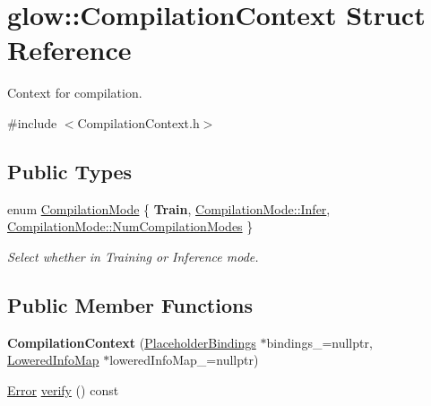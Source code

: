 \hypertarget{structglow_1_1_compilation_context}{}\section{glow\+:\+:Compilation\+Context Struct Reference}
\label{structglow_1_1_compilation_context}


Context for compilation.  




{\ttfamily \#include $<$Compilation\+Context.\+h$>$}

\subsection*{Public Types}
\begin{DoxyCompactItemize}
\item 
enum \hyperlink{structglow_1_1_compilation_context_a92efb87746c0edf7756b84fdcd87014a}{Compilation\+Mode} \{ {\bfseries Train}, 
\hyperlink{structglow_1_1_compilation_context_a92efb87746c0edf7756b84fdcd87014aa442b0d534b230e2f2c9b562974652f79}{Compilation\+Mode\+::\+Infer}, 
\hyperlink{structglow_1_1_compilation_context_a92efb87746c0edf7756b84fdcd87014aa9fd1bb83eed98173b7291341f46dce86}{Compilation\+Mode\+::\+Num\+Compilation\+Modes}
 \}\begin{DoxyCompactList}\small\item\em Select whether in Training or Inference mode. \end{DoxyCompactList}
\end{DoxyCompactItemize}
\subsection*{Public Member Functions}
\begin{DoxyCompactItemize}
\item 
\mbox{\label{structglow_1_1_compilation_context_a97e61dac204d0f830e5cc88352460ff8}} 
{\bfseries Compilation\+Context} (\hyperlink{classglow_1_1_placeholder_bindings}{Placeholder\+Bindings} $\ast$bindings\+\_\+=nullptr, \hyperlink{namespaceglow_a419aca63ca48becda137d774dd06493c}{Lowered\+Info\+Map} $\ast$lowered\+Info\+Map\+\_\+=nullptr)
\item 
\hyperlink{namespaceglow_afdb176c3a672ef66db0ecfc19a8d39bf}{Error} \hyperlink{structglow_1_1_compilation_context_a636e4b05d0dce25f559262c31ac8f0a9}{verify} () const
\end{DoxyCompactItemize}
